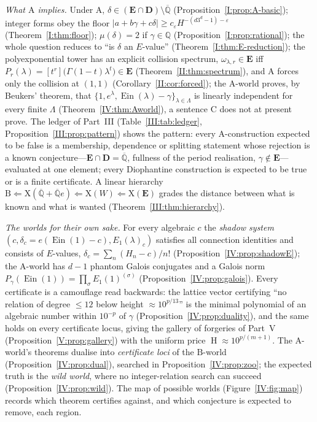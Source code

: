 \documentclass[11pt,a4paper]{article}
\newcommand{\Q}{\mathbb Q}
\newcommand{\Qbar}{\overline{\mathbb Q}}
\newcommand{\Ein}{\operatorname{Ein}}
\newcommand{\EE}{\mathbf E}
\newcommand{\DD}{\mathbf D}
\DeclareMathOperator{\Ht}{H}
\theoremstyle{definition}
\theoremstyle{remark}
\numberwithin{equation}{section}
\begin{document}
\emph{What $\mathrm A$ implies.} Under $\mathrm A$, $\delta\in(\EE\cap\DD)\setminus\Qbar$
(Proposition~\ref{I:prop:A-basic}); integer forms obey the floor
$|a+b\gamma+c\delta|\ge c_\varepsilon H^{-(d3^d-1)-\varepsilon}$ (Theorem~\ref{I:thm:floor});
$\mu(\delta)=2$ if $\gamma\in\Q$ (Proposition~\ref{I:prop:rational}); the whole question
reduces to ``is $\delta$ an $E$-value'' (Theorem~\ref{I:thm:E-reduction}); the
polyexponential tower has an explicit collision spectrum, $\omega_{\lambda,r}\in\EE$ iff
$P_r(\lambda)=[t^r]\bigl(\Gamma(1-t)\lambda^t\bigr)\in\EE$
(Theorem~\ref{II:thm:spectrum}), and $\mathrm A$ forces only the collision at $(1,1)$
(Corollary~\ref{II:cor:forced}); the $\mathrm A$-world proves, by Beukers' theorem, that
$\{1,e^\lambda,\Ein(\lambda)-\gamma\}_{\lambda\in\Lambda}$ is linearly independent for
every finite $\Lambda$ (Theorem~\ref{IV:thm:Aworld}), a sentence $\mathrm C$ does not at
present prove. The ledger of Part~III (Table~\ref{III:tab:ledger},
Proposition~\ref{III:prop:pattern}) shows the pattern: every $\mathrm A$-construction
expected to be false is a membership, dependence or splitting statement whose rejection
is a known conjecture---$\EE\cap\DD=\Qbar$, fullness of the period realisation,
$\gamma\notin\EE$---evaluated at one element; every Diophantine construction is expected
to be true or is a finite certificate. A linear hierarchy
$\mathrm B\Leftarrow\mathrm X(\Qbar+\Qbar e)\Leftarrow\mathrm X(W)\Leftarrow\mathrm X(\EE)$
grades the distance between what is known and what is wanted
(Theorem~\ref{III:thm:hierarchy}).

\emph{The worlds for their own sake.} For every algebraic $c$ the \emph{shadow system}
$(c,\delta_c=e(\Ein(1)-c),E_1(\lambda)_c)$ satisfies all connection identities and consists
of $E$-values, $\delta_c=\sum_n(H_n-c)/n!$ (Proposition~\ref{IV:prop:shadowE}); the
$\mathrm A$-world has $d-1$ phantom Galois conjugates and a Galois norm
$P_\gamma(\Ein(1))=\prod_\sigma E_1(1)^{(\sigma)}$ (Proposition~\ref{IV:prop:galois}). Every
certificate is a camouflage read backwards: the lattice vector certifying ``no relation of
degree $\le12$ below height $\approx10^{p/13}$'' is the minimal polynomial of an algebraic
number within $10^{-p}$ of $\gamma$ (Proposition~\ref{IV:prop:duality}), and the same holds
on every certificate locus, giving the gallery of forgeries of Part~V
(Proposition~\ref{V:prop:gallery}) with the uniform price $\Ht\approx10^{p/(m+1)}$. The
$\mathrm A$-world's theorems dualise into \emph{certificate loci} of the $\mathrm B$-world
(Proposition~\ref{IV:prop:dual}), searched in Proposition~\ref{IV:prop:zoo}; the expected
truth is the \emph{wild world}, where no integer-relation search can succeed
(Proposition~\ref{IV:prop:wild}). The map of possible worlds (Figure~\ref{IV:fig:map})
records which theorem certifies against, and which conjecture is expected to remove, each
region.
\end{document}
